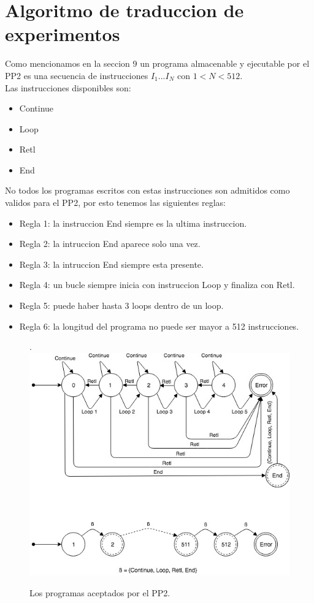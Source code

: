\section{Algoritmo de traduccion de experimentos}

Como mencionamos en la seccion 9 un programa almacenable y ejecutable por el PP2 es una secuencia de 
instrucciones \(I_{1} ... I_{N}\) con \(1 < N < 512 \).
\\
Las instrucciones disponibles son:

\begin{itemize}
    \item Continue
    \item Loop
    \item Retl
    \item End
\end{itemize}

\noindent
No todos los programas escritos con estas instrucciones son admitidos como validos para el PP2, 
por esto tenemos las siguientes reglas:

\begin{itemize}
\item Regla 1: la instruccion End siempre es la ultima instruccion.
\item Regla 2: la intruccion End aparece solo una vez.
\item Regla 3: la intruccion End siempre esta presente.
\item Regla 4: un bucle siempre inicia con instruccion Loop y finaliza con Retl.
\item Regla 5: puede haber hasta 3 loops dentro de un loop.
\item Regla 6: la longitud del programa no puede ser mayor a 512 instrucciones.
\end{itemize}


\begin{figure}[!htb].
    \includegraphics[width=\linewidth]{../figures/d12.jpg}
    \caption{Los programas aceptados por el PP2.}
    \label{fig:d12}
\end{figure}
 
